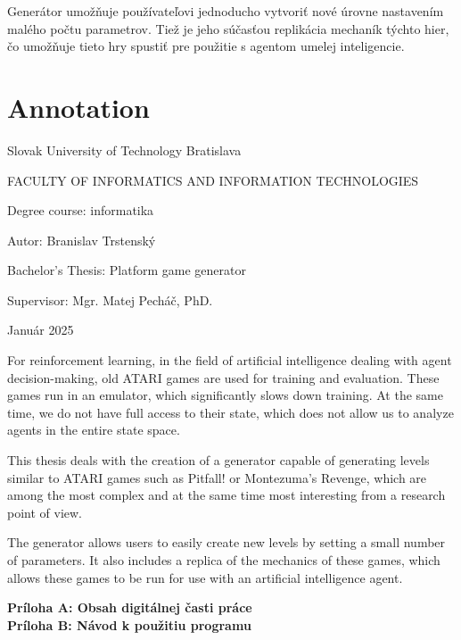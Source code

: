 Generátor umožňuje používateľovi jednoducho vytvoriť nové úrovne nastavením malého počtu parametrov. Tiež je jeho súčasťou replikácia mechaník týchto hier, čo umožňuje tieto hry spustiť pre použitie s agentom umelej inteligencie.

\newpage

\null \thispagestyle{empty}

\newpage

\section*{Annotation}

Slovak University of Technology Bratislava

FACULTY OF INFORMATICS AND INFORMATION TECHNOLOGIES


Degree course: \tab informatika

Autor: \tab Branislav Trstenský

Bachelor's Thesis: \tab Platform game generator

Supervisor: \tab Mgr. Matej Pecháč, PhD.

Január 2025

For reinforcement learning, in the field of artificial intelligence dealing with agent decision-making, old ATARI games are used for training and evaluation. These games run in an emulator, which significantly slows down training. At the same time, we do not have full access to their state, which does not allow us to analyze agents in the entire state space.

This thesis deals with the creation of a generator capable of generating levels similar to ATARI games such as Pitfall! or Montezuma's Revenge, which are among the most complex and at the same time most interesting from a research point of view.

The generator allows users to easily create new levels by setting a small number of parameters. It also includes a replica of the mechanics of these games, which allows these games to be run for use with an artificial intelligence agent.

\newpage

\null \thispagestyle{empty}

\newpage

\thispagestyle{plain}
\tableofcontents

\textbf{Príloha A: Obsah digitálnej časti práce} \\
\textbf{Príloha B: Návod k použitiu programu}

